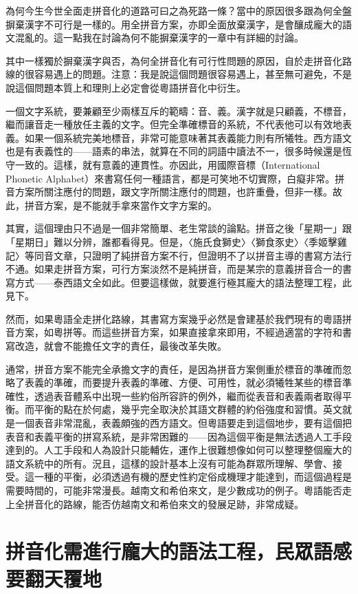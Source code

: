\documentclass[a5paper, 10pt, openany]{book} %
\begin{document}
為何今生今世全面走拼音化的道路可曰之為死路一條？當中的原因很多跟為何全盤摒棄漢字不可行是一樣的。用全拼音方案，亦即全面放棄漢字，是會釀成龐大的語文混亂的。這一點我在討論為何不能摒棄漢字的一章中有詳細的討論。

其中一樣獨於摒棄漢字與否，為何全拼音化有可行性問題的原因，自於走拼音化路線的很容易遇上的問題。注意：我是說這個問題很容易遇上，甚至無可避免，不是說這個問題本質上和理則上必定會從粵語拼音化中衍生。

一個文字系統，要兼顧至少兩樣互斥的範疇：音、義。漢字就是只顧義，不標音，繼而讓音走一種放任主義的文字。但完全準確標音的系統，不代表他可以有效地表義。如果一個系統完美地標音，非常可能意味著其表義能力則有所犧牲。西方語文也是有表義性的——語素的串法，就算在不同的詞語中讀法不一，很多時候還是恆守一致的。這樣，就有意義的連貫性。亦因此，用國際音標（International Phonetic Alphabet）來書寫任何一種語言，都是可笑地不切實際，白癡非常。拼音方案所關注應付的問題，跟文字所關注應付的問題，也許重疊，但非一樣。故此，拼音方案，是不能就手拿來當作文字方案的。

其實，這個理由只不過是一個非常簡單、老生常談的論點。拼音之後「星期一」跟「星期日」難以分辨，誰都看得見。但是，〈施氏食獅史〉〈獅食豕史〉〈季姬擊雞記〉等同音文章，只證明了純拼音方案不行，但證明不了以拼音主導的書寫方法行不通。如果走拼音方案，可行方案淡然不是純拼音，而是某宗的意義拼音合一的書寫方式——泰西語文全如此。但要這樣做，就要進行極其龐大的語法整理工程，此見下。

然而，如果粵語全走拼化路線，其書寫方案幾乎必然是會建基於我們現有的粵語拼音方案，如粵拼等。而這些拼音方案，如果直接拿來即用，不經過適當的字符和書寫改造，就會不能擔任文字的責任，最後改革失敗。

通常，拼音方案不能完全承擔文字的責任，是因為拼音方案側重於標音的準確而忽略了表義的準確，而要提升表義的準確、方便、可用性，就必須犧牲某些的標音準確性，透過表音體系中出現一些約俗所容許的例外，繼而從表音和表義兩者取得平衡。而平衡的點在於何處，幾乎完全取決於其語文群體的約俗強度和習慣。英文就是一個表音非常混亂，表義頗強的西方語文。但粵語要走到這個地步，要有這個把表音和表義平衡的拼寫系統，是非常困難的——因為這個平衡是無法透過人工手段達到的。人工手段和人為設計只能輔佐，運作上很難想像如何可以整理整個龐大的語文系統中的所有。況且，這樣的設計基本上沒有可能為群眾所理解、學會、接受。這一種的平衡，必須透過有機的歷史性約定俗成機理才能達到，而這個過程是需要時間的，可能非常漫長。越南文和希伯來文，是少數成功的例子。粵語能否走上全拼音化的路線，能否仿越南文和希伯來文的發展足跡，非常成疑。

\section{拼音化需進行龐大的語法工程，民眾語感要翻天覆地}
\end{document}
